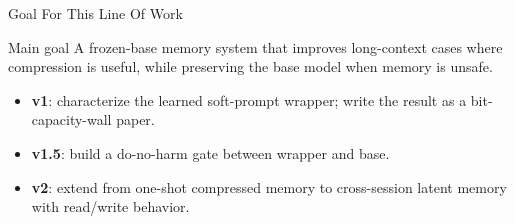 \begin{frame}{Goal For This Line Of Work}
  \begin{block}{Main goal}
    A frozen-base memory system that improves long-context cases where
    compression is useful, while preserving the base model when memory is unsafe.
  \end{block}
  \begin{itemize}
    \item \textbf{v1}: characterize the learned soft-prompt wrapper; write the
      result as a bit-capacity-wall paper.
    \item \textbf{v1.5}: build a do-no-harm gate between wrapper and base.
    \item \textbf{v2}: extend from one-shot compressed memory to cross-session
      latent memory with read/write behavior.
  \end{itemize}
\end{frame}

